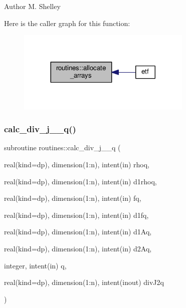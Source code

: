 \begin{DoxyAuthor}{Author}
M. Shelley 
\end{DoxyAuthor}
Here is the caller graph for this function\+:
\nopagebreak
\begin{figure}[H]
\begin{center}
\leavevmode
\includegraphics[width=236pt]{namespaceroutines_a0d41e4cd4e61ac1463c75055bf784e8b_icgraph}
\end{center}
\end{figure}
\mbox{\label{namespaceroutines_a136b7a1f0387466390decb98ce91c152}} 
\subsubsection{\texorpdfstring{calc\+\_\+div\+\_\+j\+\_\+\_\+q()}{calc\_div\_j\_2\_q()}}
{\footnotesize\ttfamily subroutine routines\+::calc\+\_\+div\+\_\+j\+\_\+\_\+q (\begin{DoxyParamCaption}\item[{real(kind=dp), dimension(1\+:n), intent(in)}]{rhoq,  }\item[{real(kind=dp), dimension(1\+:n), intent(in)}]{d1rhoq,  }\item[{real(kind=dp), dimension(1\+:n), intent(in)}]{fq,  }\item[{real(kind=dp), dimension(1\+:n), intent(in)}]{d1fq,  }\item[{real(kind=dp), dimension(1\+:n), intent(in)}]{d1\+Aq,  }\item[{real(kind=dp), dimension(1\+:n), intent(in)}]{d2\+Aq,  }\item[{integer, intent(in)}]{q,  }\item[{real(kind=dp), dimension(1\+:n), intent(inout)}]{div\+J2q }\end{DoxyParamCaption})}



